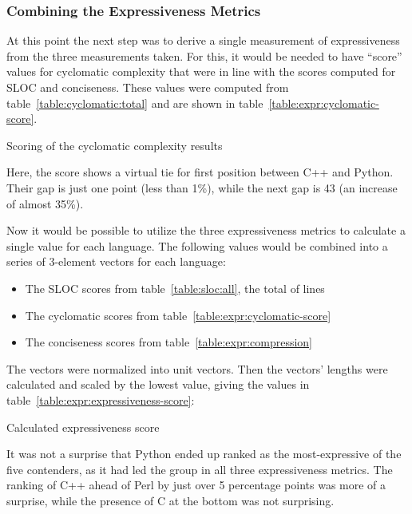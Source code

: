 \subsubsection{Combining the Expressiveness Metrics}

At this point the next step was to derive a single measurement of expressiveness from the three measurements taken. For this, it would be needed to have ``score'' values for cyclomatic complexity that were in line with the scores computed for SLOC and conciseness. These values were computed from table~\ref{table:cyclomatic:total} and are shown in table~\ref{table:expr:cyclomatic-score}.

\begin{table}[!htb]

\caption{Scoring of the cyclomatic complexity results}
\label{table:expr:cyclomatic-score}
\end{table}

Here, the score shows a virtual tie for first position between C++ and Python. Their gap is just one point (less than 1\%), while the next gap is 43 (an increase of almost 35\%).

Now it would be possible to utilize the three expressiveness metrics to calculate a single value for each language. The following values would be combined into a series of 3-element vectors for each language:

\begin{itemize}
\item The SLOC scores from table~\ref{table:sloc:all}, the total of lines
\item The cyclomatic scores from table~\ref{table:expr:cyclomatic-score}
\item The conciseness scores from table~\ref{table:expr:compression}
\end{itemize}

The vectors were normalized into unit vectors. Then the vectors' lengths were calculated and scaled by the lowest value, giving the values in table~\ref{table:expr:expressiveness-score}:

\begin{table}[!htb]

\caption{Calculated expressiveness score}
\label{table:expr:expressiveness-score}
\end{table}

It was not a surprise that Python ended up ranked as the most-expressive of the five contenders, as it had led the group in all three expressiveness metrics. The ranking of C++ ahead of Perl by just over 5 percentage points was more of a surprise, while the presence of C at the bottom was not surprising.

